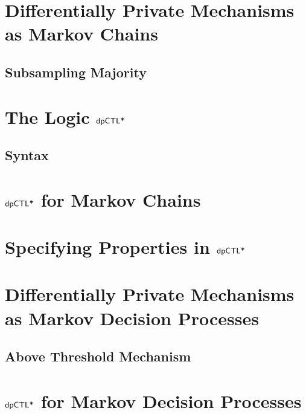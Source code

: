 \documentclass{llncs}
\begin{document}
\section{Differentially Private Mechanisms as Markov Chains}
\label{section:examples}


\subsection{Subsampling Majority}
\label{subsection:subsampling}



\section{The Logic $\textsf{dpCTL*}$}
\label{section:dpCTL}


\subsection{Syntax}
\label{subsection:syntax}


\section{$\textsf{dpCTL*}$ for Markov Chains}
\label{section:semantics}


\section{Specifying Properties in $\textsf{dpCTL*}$}
\label{section:specifying-properties}


\section{Differentially Private Mechanisms as Markov Decision Processes}
\label{section:mdp}


\subsection{Above Threshold Mechanism}
\label{subsec:threshold}


\section{$\textsf{dpCTL*}$ for Markov Decision Processes}
\label{section:semantics-mdp}

\end{document}
